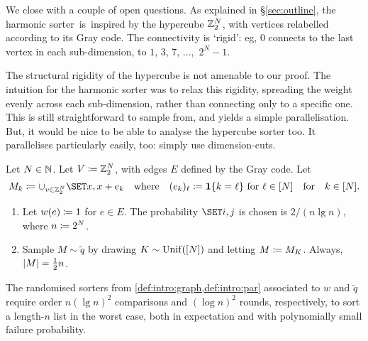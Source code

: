 \documentclass{article}
\begin{document}



We close with a couple of open questions.
As explained in \S\ref{sec:outline},
the harmonic sorter~is~inspired by the hypercube $\mathbb{Z}_2^N$, with vertices relabelled according to its Gray code.
The connectivity is `rigid': eg, $0$ connects to the last vertex in each sub-dimension, to $1$, $3$, $7$, ...,~$2^N - 1$.

The structural rigidity of the hypercube is not amenable to our proof.
The intuition for the harmonic sorter was to relax this rigidity, spreading the weight evenly across each sub-dimension, rather than connecting only to a specific one.
This is still straightforward to sample from, and yields a simple parallelisation. But, it would be nice to be able to analyse the hypercube sorter too.
It parallelises particularly easily, too:
simply use dimension-cuts.


\begin{openq*}
Let $N \in \mathbb{N}$. Let $V \coloneqq \mathbb{Z}_2^N$, with edges $E$ defined by the Gray code.
Let
\[
	M_k
\cq
	\cup_{v \in \mbz_2^N}
	\set{ x, x + e_k }
\Qwhere
	(e_k)_\ell
\cq
	\one{ k = \ell }
\text{ for }
	\ell \in [N]
\Qfor
	k \in [N].
\]
\begin{enumerate}
	\item 
	Let $w(e) \coloneqq 1$ for $e \in E$.
	The probability $\set{i,j}$ is chosen is $2/(n \lg n)$, where $n \coloneqq 2^N$.

	\item 
	Sample $M \sim \tilde q$ by drawing $K \sim \operatorname{Unif}([N])$ and letting $M \coloneqq M_K$.
	Always, $| M | = \tfrac12 n$.
\end{enumerate}

The randomised sorters from \cref{def:intro:graph,def:intro:par} associated to $w$ and $\tilde q$
require order $n (\lg n)^2$ comparisons and $(\log n)^2$ rounds, respectively, to sort a length-$n$ list in the worst case,
both in expectation and with polynomially small failure probability.
\end{openq*}
\end{document}
